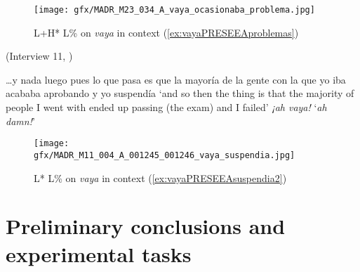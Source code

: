 \begin{figure}
	\texttt{[image: gfx/MADR\_M23\_034\_A\_vaya\_ocasionaba\_problema.jpg]}
	\caption[L+H* L\% on \textit{vaya} in context (\ref{ex:vayaPRESEEAproblemas})]{L+H* L\% on \textit{vaya} in context (\ref{ex:vayaPRESEEAproblemas}) \href{https://osf.io/kvt7j/}{\faVolumeUp} \label{fig:vayaPRESEEAproblemas}}
\end{figure}

\begin{exe} 
	\ex  (Interview 11, \cite{PRESEEA.20142020})\label{ex:vayaPRESEEAsuspendia2} 
	\begin{xlist}[A:]
	 \ldots y nada luego pues lo que pasa es que la mayoría de la gente con la que yo iba acababa aprobando y yo suspendía 
	\glt `and so then the thing is that the majority of people I went with ended up passing (the exam) and I failed' 
	 \textit{¡ah vaya!} 
	\glt `\textit{ah damn!}' 
	\end{xlist}
\end{exe}

\vfill
\begin{figure}[H]
	\texttt{[image: gfx/MADR\_M11\_004\_A\_001245\_001246\_vaya\_suspendia.jpg]}
	\caption[L* L\% on \textit{vaya} in context (\ref{ex:vayaPRESEEAsuspendia2})]{L* L\% on \textit{vaya} in context (\ref{ex:vayaPRESEEAsuspendia2}) \href{https://osf.io/r9juv/}{\faVolumeUp} \label{fig:vayaPRESEEAsuspendia}}
\end{figure}
\vfill\pagebreak

\section{Preliminary conclusions and experimental tasks}\label{ch:5.3}\largerpage

